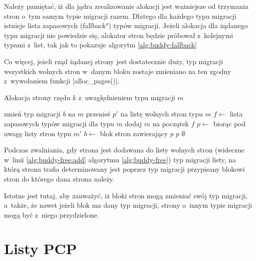 Należy pamiętać, iż dla jądra zrealizowanie alokacji jest ważniejsze
od trzymania stron o~tym samym typie migracji razem.  Dlatego dla
każdego typu migracji istnieje lista zapasowych (\ang{fallback}) typów
migracji.  Jeżeli alokacja dla żądanego typu migracji nie powiedzie
się, alokator stron będzie próbował z~kolejnymi typami z~list, tak jak
to pokazuje algorytm \ref{alg:buddy-fallback}

Co więcej, jeżeli rząd żądanej strony jest dostatecznie duży, typ
migracji wszystkich wolnych stron w~danym bloku zostaje zmieniano na
ten zgodny z~wywołaniem funkcji \code|alloc_pages()|.

\begin{algorithm}\label{alg:buddy-fallback}
\caption{Alokacja strony rzędu $k$ z~uwzględnieniem typu migracji $m$}
\begin{algorithmic}[1]
\State zmień typ migracji $b$ na $m$
    \State przenieś $p'$ na listę wolnych stron typu $m$
\EndFor
\EndFunction
\Statex
{}
    \State $f \gets$ lista zapasowych typów migracji dla typu $m$
    \State dodaj $m$ na początek $f$
        \State $p \gets$  biorąc pod uwagę listy stron typu $m'$
                \State $b \gets$ blok stron zawierający $p$
                \State {}
            \EndIf
            \State \Return $p$
        \EndIf
    \EndFor
    \State \Return $\emptyset$
\EndFunction
\end{algorithmic}
\end{algorithm}

Podczas zwalniania, gdy strona jest dodawana do listy wolnych stron
(wideczne w~linii \ref{alg:buddy-free:add} algorytmu
\ref{alg:buddy-free}) typ migracji listy, na którą strona trafia
determinowany jest poprzez typ migracji przypisany blokowi stron do
którego dana strona należy.

Istotne jest tutaj, aby zauważyć, iż bloki stron mogą zmieniać swój
typ migracji, a~także, że nawet jeżeli blok ma dany typ migracji,
strony o~innym typie migracji mogą być z~niego przydzielone.


\section{Listy PCP}\label{sec:pcp-lists}


